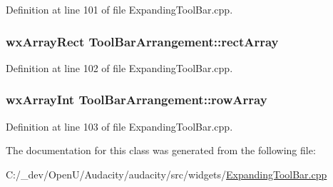 Definition at line 101 of file Expanding\+Tool\+Bar.\+cpp.

\subsubsection[{\texorpdfstring{rect\+Array}{rectArray}}]{\setlength{\rightskip}{0pt plus 5cm}wx\+Array\+Rect Tool\+Bar\+Arrangement\+::rect\+Array}\hypertarget{class_tool_bar_arrangement_ab69c99448aa3b522eff4680244b9117e}{}\label{class_tool_bar_arrangement_ab69c99448aa3b522eff4680244b9117e}


Definition at line 102 of file Expanding\+Tool\+Bar.\+cpp.

\subsubsection[{\texorpdfstring{row\+Array}{rowArray}}]{\setlength{\rightskip}{0pt plus 5cm}wx\+Array\+Int Tool\+Bar\+Arrangement\+::row\+Array}\hypertarget{class_tool_bar_arrangement_a70a5ff918d2e70d284802424ffb1c096}{}\label{class_tool_bar_arrangement_a70a5ff918d2e70d284802424ffb1c096}


Definition at line 103 of file Expanding\+Tool\+Bar.\+cpp.



The documentation for this class was generated from the following file\+:\begin{DoxyCompactItemize}
\item 
C\+:/\+\_\+dev/\+Open\+U/\+Audacity/audacity/src/widgets/\hyperlink{_expanding_tool_bar_8cpp}{Expanding\+Tool\+Bar.\+cpp}\end{DoxyCompactItemize}
